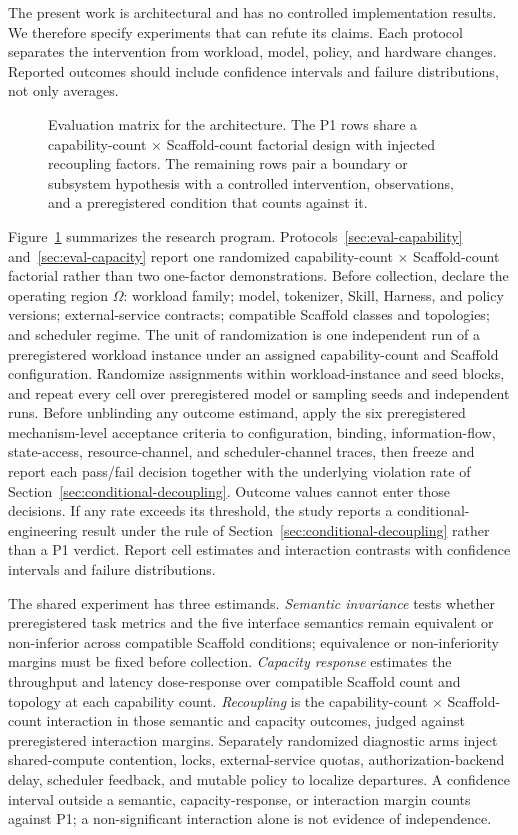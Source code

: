 The present work is architectural and has no controlled implementation results. We therefore specify experiments that can refute its claims. Each protocol separates the intervention from workload, model, policy, and hardware changes. Reported outcomes should include confidence intervals and failure distributions, not only averages.

\begin{figure}[t]
\centering
\caption{Evaluation matrix for the architecture. The P1 rows share a capability-count $\times$ Scaffold-count factorial design with injected recoupling factors. The remaining rows pair a boundary or subsystem hypothesis with a controlled intervention, observations, and a preregistered condition that counts against it.}
\label{fig:evaluation-matrix}
\end{figure}

Figure~\ref{fig:evaluation-matrix} summarizes the research program. Protocols~\ref{sec:eval-capability} and~\ref{sec:eval-capacity} report one randomized capability-count $\times$ Scaffold-count factorial rather than two one-factor demonstrations. Before collection, declare the operating region $\Omega$: workload family; model, tokenizer, Skill, Harness, and policy versions; external-service contracts; compatible Scaffold classes and topologies; and scheduler regime. The unit of randomization is one independent run of a preregistered workload instance under an assigned capability-count and Scaffold configuration. Randomize assignments within workload-instance and seed blocks, and repeat every cell over preregistered model or sampling seeds and independent runs. Before unblinding any outcome estimand, apply the six preregistered mechanism-level acceptance criteria to configuration, binding, information-flow, state-access, resource-channel, and scheduler-channel traces, then freeze and report each pass/fail decision together with the underlying violation rate of Section~\ref{sec:conditional-decoupling}. Outcome values cannot enter those decisions. If any rate exceeds its threshold, the study reports a conditional-engineering result under the rule of Section~\ref{sec:conditional-decoupling} rather than a P1 verdict. Report cell estimates and interaction contrasts with confidence intervals and failure distributions.

The shared experiment has three estimands. \textit{Semantic invariance} tests whether preregistered task metrics and the five interface semantics remain equivalent or non-inferior across compatible Scaffold conditions; equivalence or non-inferiority margins must be fixed before collection. \textit{Capacity response} estimates the throughput and latency dose-response over compatible Scaffold count and topology at each capability count. \textit{Recoupling} is the capability-count $\times$ Scaffold-count interaction in those semantic and capacity outcomes, judged against preregistered interaction margins. Separately randomized diagnostic arms inject shared-compute contention, locks, external-service quotas, authorization-backend delay, scheduler feedback, and mutable policy to localize departures. A confidence interval outside a semantic, capacity-response, or interaction margin counts against P1; a non-significant interaction alone is not evidence of independence.

